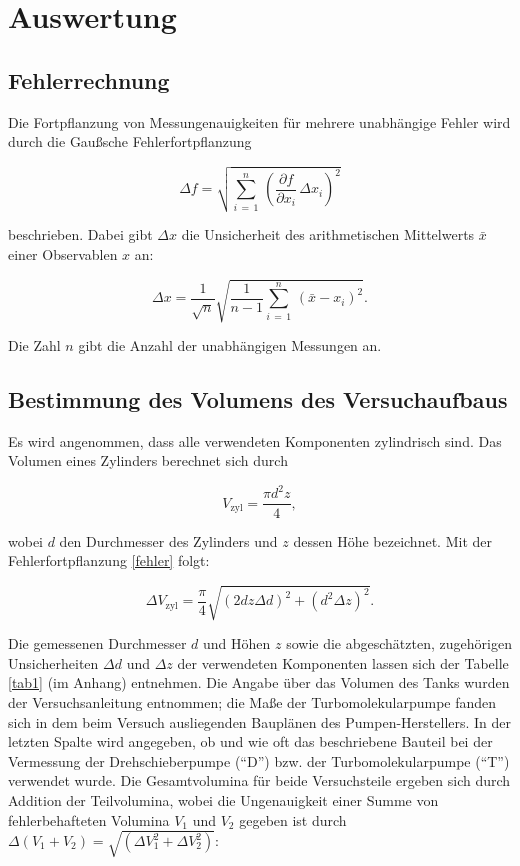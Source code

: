 \section{Auswertung}

\subsection{Fehlerrechnung}

Die Fortpflanzung von Messungenauigkeiten für mehrere unabhängige Fehler wird durch die Gaußsche Fehlerfortpflanzung

\begin{equation}
\Delta f = \sqrt{\sum_{i \, = \, 1}^{n} \, \left(\frac{\partial f}{\partial x_i} \, \Delta x_i\right)^2}
\label{fehler}
\end{equation}

beschrieben. Dabei gibt $\Delta x$ die Unsicherheit des arithmetischen Mittelwerts $\bar{x}$ einer Observablen $x$ an:

\begin{equation}
\Delta x = \frac{1}{\sqrt{n}} \sqrt{\frac{1}{n-1} \sum_{i \, = \, 1}^{n} \, \left(\bar{x}- x_i\right)^2}.
\end{equation}

Die Zahl $n$ gibt die Anzahl der unabhängigen Messungen an.


\subsection{Bestimmung des Volumens des Versuchaufbaus}

Es wird angenommen, dass alle verwendeten Komponenten zylindrisch sind. Das Volumen eines Zylinders berechnet sich durch

\begin{equation}
V_\text{zyl} = \frac{\pi d^2 z}{4},
\end{equation}

wobei $d$ den Durchmesser des Zylinders und $z$ dessen Höhe bezeichnet. Mit der Fehlerfortpflanzung \eqref{fehler} folgt:

\begin{equation}
\Delta V_\text{zyl} = \frac{\pi}{4} \sqrt{(2 d z \Delta d)^2 + (d^2 \Delta z)^2}.
\end{equation}

Die gemessenen Durchmesser $d$ und Höhen $z$ sowie die abgeschätzten, zugehörigen Unsicherheiten $\Delta d$ und $\Delta z$ der verwendeten Komponenten lassen sich der Tabelle \ref{tab1} (im Anhang) entnehmen. Die Angabe über das Volumen des Tanks wurden der Versuchsanleitung \cite{V70} entnommen; die Maße der Turbomolekularpumpe fanden sich in dem beim Versuch ausliegenden Bauplänen des Pumpen-Herstellers. In der letzten Spalte wird angegeben, ob und wie oft das beschriebene Bauteil bei der Vermessung der Drehschieberpumpe (\enquote{D}) bzw. der Turbomolekularpumpe (\enquote{T}) verwendet wurde. Die Gesamtvolumina für beide Versuchsteile ergeben sich durch Addition der Teilvolumina, wobei die Ungenauigkeit einer Summe von fehlerbehafteten Volumina $V_1$ und $V_2$ gegeben ist durch $\Delta (V_1 + V_2) = \sqrt{\left(\Delta V_1^2 + \Delta V_2^2\right)}$:

